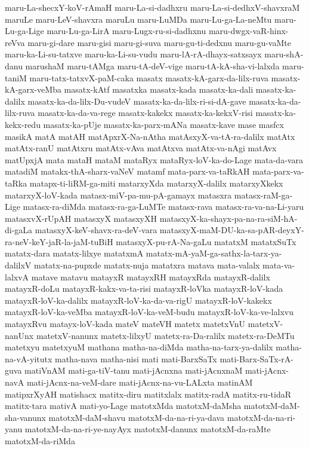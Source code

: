 {maru-La-shecxY-koV-rAmaH
maru-La-si-dadhxru
maru-La-si-dedhxV-shavxraM
maruLe
maru-LeV-shavxra
maruLu
maru-LuMDa
maru-Lu-ga-La-neMtu
maru-Lu-ga-Lige
maru-Lu-ga-LirA
maru-Lugx-ru-si-dadhxnu
maru-dwgx-vaR-hinx-reVva
maru-gi-dare
maru-gisi
maru-gi-suva
maru-gu-ti-dedxnu
maru-gu-vaMte
maru-ka-Li-su-tatxve
maru-ka-Li-su-vudu
maru-lA-rA-dhayx-satxsayx
maru-shA-danu
marushaM
maru-tAMga
maru-tA-deV-vige
maru-tA-kA-sha-vi-lalxda
maru-taniM
maru-tatx-tatxvX-paM-caka
masatx
masatx-kA-garx-da-lilx-ruva
masatx-kA-garx-veMba
masatx-kAtf
masatxka
masatx-kada
masatx-ka-dali
masatx-ka-dalilx
masatx-ka-da-lilx-Du-vudeV
masatx-ka-da-lilx-ri-si-dA-gave
masatx-ka-da-lilx-ruva
masatx-ka-da-va-rege
masatx-kakekx
masatx-ka-kekxV-risi
masatx-ka-kekx-redu
masatx-ka-pUje
masatx-ka-parx-mANa
masatx-kave
mase
masfcx
masikA
matA
matAH
matApxrX-Na-nAtha
matAsxyX-va-tA-ra-dalilx
matAtx
matAtx-ranU
matAtxru
matAtx-vAva
matAtxva
matAtx-va-nAgi
matAvx
matUpxjA
mata
mataH
mataM
mataRyx
mataRyx-loV-ka-do-Lage
mata-da-vara
matadiM
matakx-thA-sharx-vaNeV
matamf
mata-parx-va-taRkAH
mata-parx-va-taRka
matapx-ti-liRM-ga-miti
matarxyXda
matarxyX-dalilx
matarxyXkekx
matarxyX-loV-kada
matasx-miV-pa-mu-pA-gamayx
matasxra
matasx-raM-ga-Lige
matasx-ra-diMda
matasx-ra-ga-LuMTe
matasx-rava
matasx-ra-va-na-Li-yaru
matasxvX-rUpAH
matasxyX
matasxyXH
matasxyX-ka-shayx-pa-na-ra-siM-hA-di-gaLa
matasxyX-keV-shavx-ra-deV-vara
matasxyX-maM-DU-ka-sa-pAR-deyxY-ra-neV-keY-jaR-la-jaM-tuBiH
matasxyX-pu-rA-Na-gaLu
matatxM
matatxSuTx
matatx-dara
matatx-lilxye
matatxmA
matatx-mA-yaM-ga-sathx-la-tarx-ya-dalilxV
matatx-na-pupxde
matatx-nuja
matatxra
matava
mata-valalx
mata-va-lalxvA
matave
matavu
matayxR
matayxRH
matayxRda
matayxR-dalilx
matayxR-doLu
matayxR-kakx-va-ta-risi
matayxR-loVka
matayxR-loV-kada
matayxR-loV-ka-dalilx
matayxR-loV-ka-da-va-rigU
matayxR-loV-kakekx
matayxR-loV-ka-veMba
matayxR-loV-ka-veM-budu
matayxR-loV-ka-ve-lalxvu
matayxRvu
matayx-loV-kada
mateV
mateVH
matetx
matetxVnU
matetxV-nanUnx
matetxV-nanunx
matetx-lilxyU
matetx-ra-Da-ralilx
matetx-ra-DeMTu
matetxyu
matetxyuM
mathana
matha-na-diMda
matha-na-tarx-ya-dalilx
matha-na-vA-yitutx
matha-nava
matha-nisi
mati
mati-BarxSaTx
mati-Barx-SaTx-rA-guva
matiVnAM
mati-ga-tiV-tanu
mati-jAcnxna
mati-jAcnxnaM
mati-jAcnx-navA
mati-jAcnx-na-veM-dare
mati-jAcnx-na-vu-LALxta
matinAM
matipxrXyAH
matishacx
matitx-diru
matitxlalx
matitx-radA
matitx-ru-tidaR
matitx-tara
mativA
mati-yo-Lage
matotxMda
matotxM-daMsha
matotxM-daM-sha-vanunx
matotxM-daM-shavu
matotxM-da-na-ri-ya-dava
matotxM-da-na-ri-yanu
matotxM-da-na-ri-ye-nayAyx
matotxM-danunx
matotxM-da-raMte
matotxM-da-riMda
}
